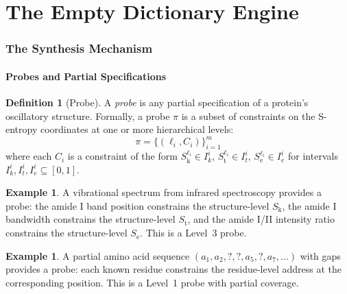 \documentclass[11pt,twocolumn,a4paper]{article}
\theoremstyle{definition}
\newtheorem{definition}[theorem]{Definition}
\newtheorem{example}[theorem]{Example}
\theoremstyle{remark}
\newcommand{\Sk}{S_{\mathrm{k}}}
\newcommand{\St}{S_{\mathrm{t}}}
\newcommand{\Se}{S_{\mathrm{e}}}
\begin{document}

\part{The Empty Dictionary Engine}

\section{The Synthesis Mechanism}
\label{sec:synthesis}

\subsection{Probes and Partial Specifications}

\begin{definition}[Probe]
\label{def:probe}
A \emph{probe} is any partial specification of a protein's oscillatory structure. Formally, a probe $\pi$ is a subset of constraints on the S-entropy coordinates at one or more hierarchical levels:
\begin{equation}
\pi = \{(\ell_i, C_i)\}_{i=1}^m
\end{equation}
where each $C_i$ is a constraint of the form $\Sk^{\ell_i} \in I_k^i$, $\St^{\ell_i} \in I_t^i$, $\Se^{\ell_i} \in I_e^i$ for intervals $I_k^i, I_t^i, I_e^i \subseteq [0,1]$.
\end{definition}

\begin{example}
A vibrational spectrum from infrared spectroscopy provides a probe: the amide I band position constrains the structure-level $\Sk$, the amide I bandwidth constrains the structure-level $\St$, and the amide I/II intensity ratio constrains the structure-level $\Se$. This is a Level~3 probe.
\end{example}

\begin{example}
A partial amino acid sequence $(a_1, a_2, ?, ?, a_5, ?, a_7, \ldots)$ with gaps provides a probe: each known residue constrains the residue-level address at the corresponding position. This is a Level~1 probe with partial coverage.
\end{example}
\end{document}
